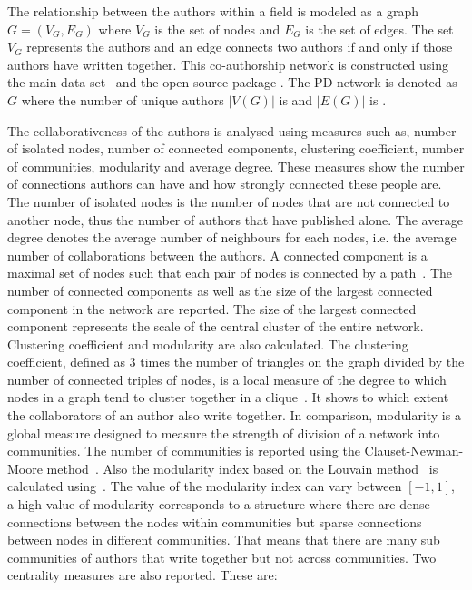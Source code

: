 \documentclass{article}
\theoremstyle{definition}
\newcommand{\authors}{}
\newcommand{\edges}{\unskip}
\begin{document}
The relationship between the authors within a field is modeled as a graph
\(G = (V_G, E_G)\) where \(V_G\) is the set of nodes and \(E_G\)  is the set of
edges. The set \(V_G\) represents the authors and an edge connects two authors
if and only if those authors have written together. This co-authorship network is
constructed using the main data set~\cite{pd_data_2018} and the open source package
\cite{networkx}. The PD network is denoted as \(G\) where the
number of unique authors \(|V(G)|\) is \authors and \(|E(G)|\) is \edges.


The collaborativeness of the authors is analysed using measures such as, number of isolated nodes,
number of connected components, clustering coefficient, number of communities, modularity and average degree.
These measures show the number of connections authors can have
and how strongly connected these people are. The number of isolated nodes is the
number of nodes that are not connected to another node, thus the
number of authors that have published alone. The average degree denotes the average
number of neighbours for each nodes, i.e. the average number of collaborations
between the authors.
A connected component is a maximal set of nodes such that each pair of nodes is
connected by a path~\cite{Easley2010}. The number of connected components as well as the size of the
largest connected component in the network are reported.
The size of the largest connected component represents the scale of the central cluster
of the entire network.
Clustering coefficient and modularity are also calculated. The clustering
coefficient, defined as 3 times the number of triangles on the graph divided
by the number of connected triples of nodes, is a local measure of the degree to
which nodes in a graph tend to cluster together
in a clique~\cite{Easley2010}. It shows to which extent the collaborators
of an author also write together.
In comparison, modularity is a global measure designed to measure the strength of
division of a network into communities. The number of communities is reported
using the Clauset-Newman-Moore method~\cite{clauset2004}. Also the modularity index
based on the Louvain method~\cite{Blondel2008} is calculated using~\cite{python_louvain}. The value
of the modularity index can vary between \([-1, 1]\), a high value of modularity
corresponds to a structure where there are dense connections between the nodes within
communities but sparse connections between nodes in different communities.
That means that there are many sub communities of authors that write together
but not across communities.
Two centrality measures are also reported. These are:
\end{document}
